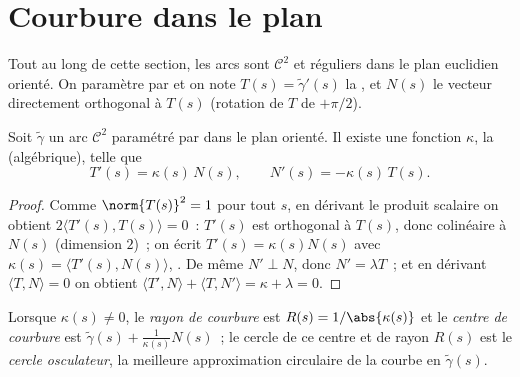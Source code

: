 \section{Courbure dans le plan}

Tout au long de cette section, les arcs sont $\mathcal{C}^2$ et
réguliers dans le plan euclidien orienté. On paramètre par
 et on note $T(s) = \tilde\gamma'(s)$ la 
, et $N(s)$ le vecteur  directement orthogonal à
$T(s)$ (rotation de $T$ de $+\pi/2$).

\begin{theorem}\label{thm:b2:curves:frenet2d}
Soit $\tilde\gamma$ un arc $\mathcal{C}^2$ paramétré par  dans le plan orienté. Il existe une fonction 
$\kappa$, la \emph{} (algébrique), telle
que
\[
T'(s) = \kappa(s)\, N(s),
\qquad
N'(s) = -\kappa(s)\, T(s).
\]
\end{theorem}

\begin{proof}
Comme $\norm{T(s)}^2 = 1$ pour tout $s$, en dérivant le produit
scalaire on obtient $2\langle T'(s), T(s)\rangle = 0$~: $T'(s)$ est
orthogonal à $T(s)$, donc colinéaire à $N(s)$ (dimension $2$)~; on
écrit $T'(s) = \kappa(s) N(s)$ avec $\kappa(s) = \langle T'(s),
N(s)\rangle$, . De même $N' \perp N$, donc $N' = \lambda
T$~; et en dérivant $\langle T, N\rangle = 0$ on obtient $\langle
T', N\rangle + \langle T, N'\rangle = \kappa + \lambda = 0$.
\end{proof}

\begin{definition}\label{def:b2:curves:curvature}
Lorsque $\kappa(s) \neq 0$, le \emph{rayon de
courbure} est $R(s) =
1/\abs{\kappa(s)}$ et le \emph{centre de courbure} est
$\tilde\gamma(s) + \frac{1}{\kappa(s)} N(s)$~; le cercle de ce
centre et de rayon $R(s)$ est le \emph{cercle
osculateur}, la
meilleure approximation circulaire de la courbe en $\tilde\gamma(s)$.
\end{definition}

